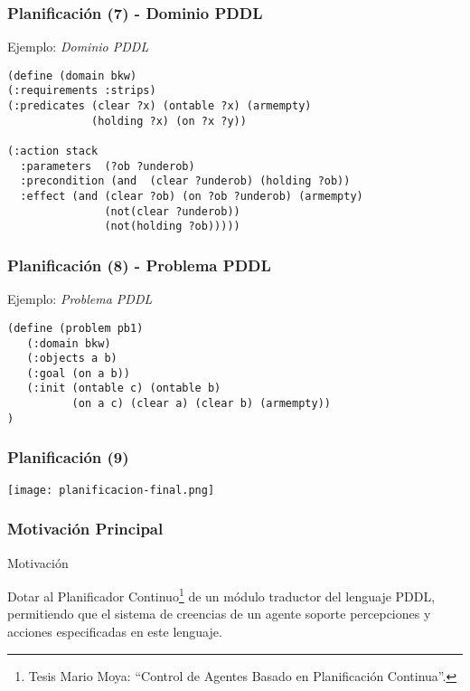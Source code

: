 \documentclass[bigger]{beamer}
\begin{document}
\begin{frame}[fragile]
\frametitle{Planificación (7) - Dominio PDDL}
\label{sec-1.8}
\begin{block}{Ejemplo: \emph{Dominio PDDL}}
\label{sec-1.8.1}

 \begin{verbatim}
(define (domain bkw)
(:requirements :strips)
(:predicates (clear ?x) (ontable ?x) (armempty)
             (holding ?x) (on ?x ?y))

(:action stack
  :parameters  (?ob ?underob)
  :precondition (and  (clear ?underob) (holding ?ob))
  :effect (and (clear ?ob) (on ?ob ?underob) (armempty)
               (not(clear ?underob)) 
               (not(holding ?ob)))))
 \end{verbatim}
\end{block}
\end{frame}
\begin{frame}[fragile]
\frametitle{Planificación (8) - Problema PDDL}
\label{sec-1.9}
\begin{block}{Ejemplo: \emph{Problema PDDL}}
\label{sec-1.9.1}

 \begin{verbatim}
(define (problem pb1)
   (:domain bkw)
   (:objects a b)
   (:goal (on a b))
   (:init (ontable c) (ontable b) 
          (on a c) (clear a) (clear b) (armempty))
)
 \end{verbatim}
\end{block}
\end{frame}
\begin{frame}
\frametitle{Planificación (9)}
\label{sec-1.10}

\begin{center} \texttt{[image: planificacion-final.png]} \end{center}
\end{frame}
\begin{frame}
\frametitle{Motivación Principal}
\label{sec-1.11}
\begin{block}{Motivación}
\label{sec-1.11.1}


Dotar al Planificador Continuo\footnote{Tesis Mario Moya: ``Control de Agentes Basado en Planificación Continua''. } de un módulo traductor del lenguaje
PDDL, permitiendo que el sistema de creencias de un agente soporte
percepciones y acciones especificadas en este lenguaje.
\end{block}
\end{frame}
\end{document}
